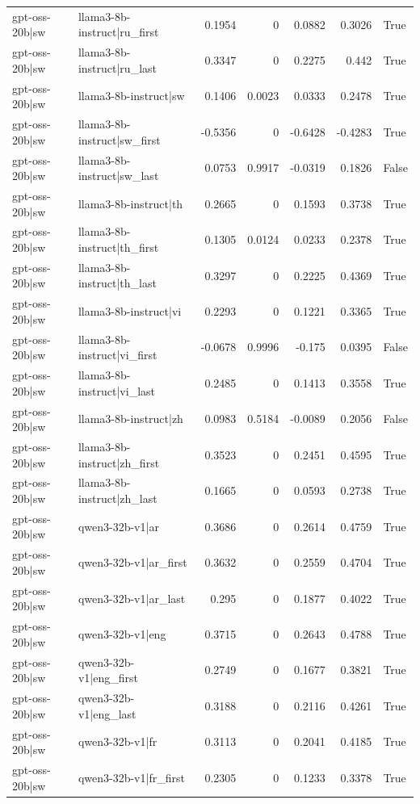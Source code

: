 \begin{table}
\begin{tabular}{l l r r r r l}
gpt-oss-20b|sw & llama3-8b-instruct|ru_first & 0.1954 & 0 & 0.0882 & 0.3026 & True \\
gpt-oss-20b|sw & llama3-8b-instruct|ru_last & 0.3347 & 0 & 0.2275 & 0.442 & True \\
gpt-oss-20b|sw & llama3-8b-instruct|sw & 0.1406 & 0.0023 & 0.0333 & 0.2478 & True \\
gpt-oss-20b|sw & llama3-8b-instruct|sw_first & -0.5356 & 0 & -0.6428 & -0.4283 & True \\
gpt-oss-20b|sw & llama3-8b-instruct|sw_last & 0.0753 & 0.9917 & -0.0319 & 0.1826 & False \\
gpt-oss-20b|sw & llama3-8b-instruct|th & 0.2665 & 0 & 0.1593 & 0.3738 & True \\
gpt-oss-20b|sw & llama3-8b-instruct|th_first & 0.1305 & 0.0124 & 0.0233 & 0.2378 & True \\
gpt-oss-20b|sw & llama3-8b-instruct|th_last & 0.3297 & 0 & 0.2225 & 0.4369 & True \\
gpt-oss-20b|sw & llama3-8b-instruct|vi & 0.2293 & 0 & 0.1221 & 0.3365 & True \\
gpt-oss-20b|sw & llama3-8b-instruct|vi_first & -0.0678 & 0.9996 & -0.175 & 0.0395 & False \\
gpt-oss-20b|sw & llama3-8b-instruct|vi_last & 0.2485 & 0 & 0.1413 & 0.3558 & True \\
gpt-oss-20b|sw & llama3-8b-instruct|zh & 0.0983 & 0.5184 & -0.0089 & 0.2056 & False \\
gpt-oss-20b|sw & llama3-8b-instruct|zh_first & 0.3523 & 0 & 0.2451 & 0.4595 & True \\
gpt-oss-20b|sw & llama3-8b-instruct|zh_last & 0.1665 & 0 & 0.0593 & 0.2738 & True \\
gpt-oss-20b|sw & qwen3-32b-v1|ar & 0.3686 & 0 & 0.2614 & 0.4759 & True \\
gpt-oss-20b|sw & qwen3-32b-v1|ar_first & 0.3632 & 0 & 0.2559 & 0.4704 & True \\
gpt-oss-20b|sw & qwen3-32b-v1|ar_last & 0.295 & 0 & 0.1877 & 0.4022 & True \\
gpt-oss-20b|sw & qwen3-32b-v1|eng & 0.3715 & 0 & 0.2643 & 0.4788 & True \\
gpt-oss-20b|sw & qwen3-32b-v1|eng_first & 0.2749 & 0 & 0.1677 & 0.3821 & True \\
gpt-oss-20b|sw & qwen3-32b-v1|eng_last & 0.3188 & 0 & 0.2116 & 0.4261 & True \\
gpt-oss-20b|sw & qwen3-32b-v1|fr & 0.3113 & 0 & 0.2041 & 0.4185 & True \\
gpt-oss-20b|sw & qwen3-32b-v1|fr_first & 0.2305 & 0 & 0.1233 & 0.3378 & True \\

\end{tabular}
\end{table}

